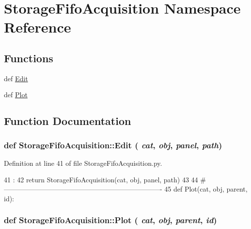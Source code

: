 \hypertarget{namespaceStorageFifoAcquisition}{
\section{StorageFifoAcquisition Namespace Reference}
\label{namespaceStorageFifoAcquisition}
}
\subsection*{Functions}
\begin{DoxyCompactItemize}
\item 
def \hyperlink{namespaceStorageFifoAcquisition_addc0269a6e9ed56eb480ecbd7b39f12a}{Edit}
\item 
def \hyperlink{namespaceStorageFifoAcquisition_af6e0087a7fbbb4972223692ba79b1a63}{Plot}
\end{DoxyCompactItemize}


\subsection{Function Documentation}
\hypertarget{namespaceStorageFifoAcquisition_addc0269a6e9ed56eb480ecbd7b39f12a}{
\subsubsection[{Edit}]{\setlength{\rightskip}{0pt plus 5cm}def StorageFifoAcquisition::Edit ( {\em cat}, \/   {\em obj}, \/   {\em panel}, \/   {\em path})}}
\label{namespaceStorageFifoAcquisition_addc0269a6e9ed56eb480ecbd7b39f12a}


Definition at line 41 of file StorageFifoAcquisition.py.


\begin{DoxyCode}
41                                 :
42     return StorageFifoAcquisition(cat, obj, panel, path)
43 
44 #----------------------------------------------------------------------
45 
def Plot(cat, obj, parent, id):
\end{DoxyCode}
\hypertarget{namespaceStorageFifoAcquisition_af6e0087a7fbbb4972223692ba79b1a63}{
\subsubsection[{Plot}]{\setlength{\rightskip}{0pt plus 5cm}def StorageFifoAcquisition::Plot ( {\em cat}, \/   {\em obj}, \/   {\em parent}, \/   {\em id})}}
\label{namespaceStorageFifoAcquisition_af6e0087a7fbbb4972223692ba79b1a63}


